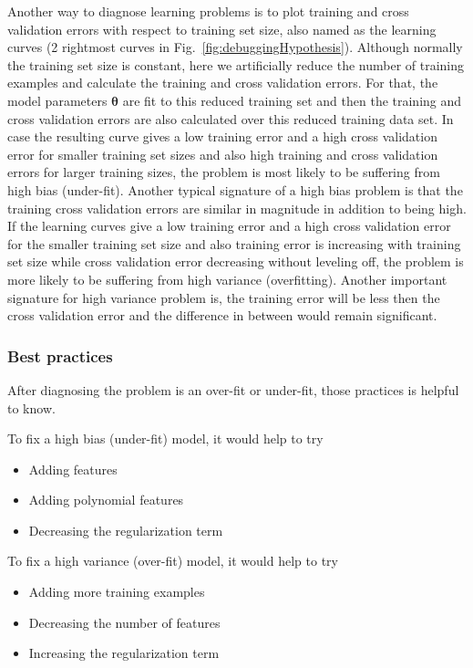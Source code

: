 Another way to diagnose learning problems is to plot training and cross validation errors with respect to training set size, also named as the learning curves (2 rightmost curves in Fig.~\ref{fig:debuggingHypothesis}). 
Although normally the training set size is constant, here we artificially reduce the number of training examples and calculate the training and cross validation errors. 
For that, the model parameters $\bm{\theta}$ are fit to this reduced training set and then the training and cross validation errors are also calculated over this reduced training data set. 
In case the resulting curve gives a low training error and a high cross validation error for smaller training set sizes and also high training and cross validation errors for larger training sizes, the problem is most likely to be suffering from high bias (under-fit). 
Another typical signature of a high bias problem is that the training cross validation errors are similar in magnitude in addition to being high. 
If the learning curves give a low training error and a high cross validation error for the smaller training set size and also training error is increasing with training set size while cross validation error decreasing without leveling off, the problem is more likely to be suffering from high variance (overfitting). 
Another important signature for high variance problem is, the training error will be less then the cross validation error and the difference in between would remain significant. 

\subsubsection{Best practices}

After diagnosing the problem is an over-fit or under-fit, those practices is helpful to know. 

To fix a high bias (under-fit) model, it would help to try 

\begin{itemize}

\item{Adding features}
\item{Adding polynomial features}
\item{Decreasing the regularization term}

\end{itemize}

To fix a high variance (over-fit) model, it would help to try 

\begin{itemize}

\item{Adding more training examples}
\item{Decreasing the number of features}
\item{Increasing the regularization term}

\end{itemize}

